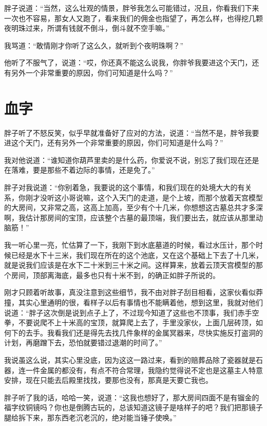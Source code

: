 胖子说道：“当然，这么壮观的情景，胖爷我怎么可能错过，况且，你看我们下来一次也不容易，那女人又跑了，看来我们的佣金也指望了，再怎么样，也得挖几颗夜明珠过来，所谓有钱就不倒斗，倒斗就不空手嘛。”

我骂道：“敢情刚才你听了这么久，就听到个夜明珠啊？”

他听了不服气了，说道：“哎，你还真不能这么说我，你胖爷我要进这个天门，还有另外一个非常重要的原因，你们可知道是什么吗？”

\chapter{血字}

胖子听了不怒反笑，似乎早就准备好了应对的方法，说道：“当然不是，胖爷我要进这个天门，还有另外一个非常重要的原因，你们可知道是什么吗？”

我对他说道：“谁知道你葫芦里卖的是什么药，你爱说不说，别忘了我们现在还是在落难，要是那些不着边际的事情，还是免了。”

胖子对我说道：“你别着急，我要说的这个事情，和我们现在的处境大大的有关系，你刚才没听这小哥说嘛，这个入天门的走道，是个上坡，而那个放着天宫模型的大房间，又非常之高，这高上加高，至少有个十几米，你想想这古墓总共才多深啊，我估计那房间的宝顶，应该整个古墓的最顶端，我们要出去，就应该从那里动脑筋！”

我一听心里一亮，忙估算了一下，我刚下到水底墓道的时候，看过水压计，那个时候已经是水下十三米，我们现在所在的这个池底，又在这个基础上下去了十几米，就是说我们应该是在水下二十米到三十米之间。这样算来，放着云顶天宫模型的那个房间，顶部离海底，最多也只有十米不到，的确正如胖子所说的。

刚才只顾着听故事，真没注意到这些细节，我不由对胖子刮目相看，这家伙看似莽撞，其实心里通明的很，看样子以后有事情也不能瞒着他，想到这里，我就对他们说道：“胖子这次倒是说到点子上了，不过现今知道了这些也不顶事，我们赤手空拳，不要说爬不上十米高的宝顶，就算爬上去了，手里没家伙，上面几层砖顶，如何下的去手。我看我们还是得先去找几件象样的金属冥器来，尽快实施反打盗洞的计划，再磨蹭下去，恐怕就要错过退潮的时间了。”

我说虽这么说，其实心里没底，因为这这一路过来，看到的赔葬品除了瓷器就是石器，连一件金属的都没有，有点不符合常理，我隐约觉得说不定也是这墓主人特意安排，现在只能去后殿里找找，要那也没有，那真是天要亡我也。

胖子听了我的话，哈哈一笑，说道：“这我也想好了，那大房间四面不是有镏金的福字纹铜镜吗？你也是倒腾古玩的，总该知道这镜子是啥样子的吧？我们把那镜子腿给拆下来，那东西老沉老沉的，绝对能当锤子使唤。”

